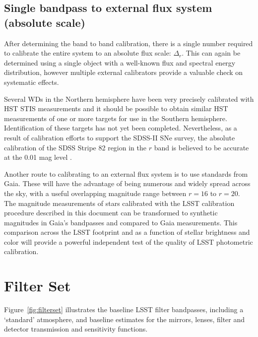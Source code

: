 \documentclass[12pt,preprint]{aastex}
\begin{document}
\subsection{Single bandpass to external flux system (absolute scale)}

After determining the band to band calibration, there is a single
number required to calibrate the entire system to an absolute flux
scale: $\Delta_r$.  This can again be determined using a single
object with a well-known flux and spectral energy distribution,
however multiple external calibrators provide a valuable check on
systematic effects. 

Several WDs in the Northern hemisphere have been very precisely
calibrated with HST STIS measurements \citep{2004AJ....128.3053B} and
it should be possible to obtain similar HST measurements of one or
more targets for use in the Southern hemisphere. Identification of
these targets has not yet been completed. Nevertheless, as a result of
calibration efforts to support the SDSS-II SNe survey, the absolute
calibration of the SDSS Stripe 82 region in the $r$ band is believed
to be accurate at the 0.01 mag level \citep{Frieman2008}. 

Another route to calibrating to an external flux system is to use
standards from Gaia. These will have the advantage of being numerous
and widely spread across the sky, with a useful overlapping magnitude range between
$r=16$ to $r=20$.  The magnitude measurements of stars calibrated with
the LSST calibration procedure described in this document can be
transformed to synthetic magnitudes in Gaia's bandpasses and compared
to Gaia measurements. This comparison across the LSST footprint and as
a function of stellar brightness and color will provide a powerful
independent test of the quality of LSST photometric calibration. 





\appendix

\newpage
\section{Filter Set}

Figure~\ref{fig:filterset} illustrates the baseline LSST filter
bandpasses, including a `standard' atmosphere, and baseline estimates
for the mirrors, lenses, filter and detector transmission and
sensitivity functions. 
\end{document}
